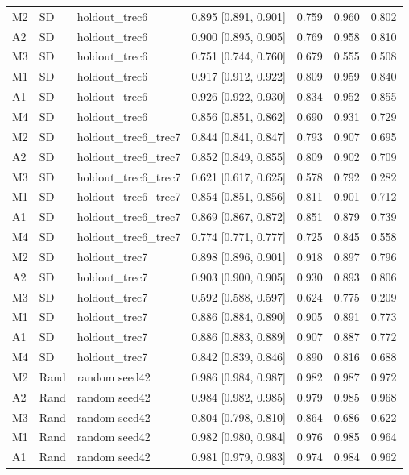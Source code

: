 \documentclass[conference]{IEEEtran}
\begin{document}
\begin{table}[!htbp]
\begin{tabular}{lllcccc}
M2 & SD & holdout\_trec6 & 0.895 [0.891, 0.901] & 0.759 & 0.960 & 0.802 \\
A2 & SD & holdout\_trec6 & 0.900 [0.895, 0.905] & 0.769 & 0.958 & 0.810 \\
M3 & SD & holdout\_trec6 & 0.751 [0.744, 0.760] & 0.679 & 0.555 & 0.508 \\
M1 & SD & holdout\_trec6 & 0.917 [0.912, 0.922] & 0.809 & 0.959 & 0.840 \\
A1 & SD & holdout\_trec6 & 0.926 [0.922, 0.930] & 0.834 & 0.952 & 0.855 \\
M4 & SD & holdout\_trec6 & 0.856 [0.851, 0.862] & 0.690 & 0.931 & 0.729 \\
M2 & SD & holdout\_trec6\_trec7 & 0.844 [0.841, 0.847] & 0.793 & 0.907 & 0.695 \\
A2 & SD & holdout\_trec6\_trec7 & 0.852 [0.849, 0.855] & 0.809 & 0.902 & 0.709 \\
M3 & SD & holdout\_trec6\_trec7 & 0.621 [0.617, 0.625] & 0.578 & 0.792 & 0.282 \\
M1 & SD & holdout\_trec6\_trec7 & 0.854 [0.851, 0.856] & 0.811 & 0.901 & 0.712 \\
A1 & SD & holdout\_trec6\_trec7 & 0.869 [0.867, 0.872] & 0.851 & 0.879 & 0.739 \\
M4 & SD & holdout\_trec6\_trec7 & 0.774 [0.771, 0.777] & 0.725 & 0.845 & 0.558 \\
M2 & SD & holdout\_trec7 & 0.898 [0.896, 0.901] & 0.918 & 0.897 & 0.796 \\
A2 & SD & holdout\_trec7 & 0.903 [0.900, 0.905] & 0.930 & 0.893 & 0.806 \\
M3 & SD & holdout\_trec7 & 0.592 [0.588, 0.597] & 0.624 & 0.775 & 0.209 \\
M1 & SD & holdout\_trec7 & 0.886 [0.884, 0.890] & 0.905 & 0.891 & 0.773 \\
A1 & SD & holdout\_trec7 & 0.886 [0.883, 0.889] & 0.907 & 0.887 & 0.772 \\
M4 & SD & holdout\_trec7 & 0.842 [0.839, 0.846] & 0.890 & 0.816 & 0.688 \\
M2 & Rand & random seed42 & 0.986 [0.984, 0.987] & 0.982 & 0.987 & 0.972 \\
A2 & Rand & random seed42 & 0.984 [0.982, 0.985] & 0.979 & 0.985 & 0.968 \\
M3 & Rand & random seed42 & 0.804 [0.798, 0.810] & 0.864 & 0.686 & 0.622 \\
M1 & Rand & random seed42 & 0.982 [0.980, 0.984] & 0.976 & 0.985 & 0.964 \\
A1 & Rand & random seed42 & 0.981 [0.979, 0.983] & 0.974 & 0.984 & 0.962 \\

\end{tabular}
\end{table}
\end{document}
